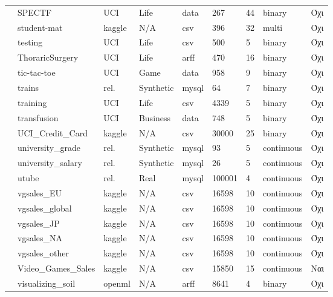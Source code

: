 {\begin{longtable}{|l| l| l | l | l | l |l | l | l | }
 				\rownumber & SPECTF \citep{spectf} & UCI & Life & data & 267 & 44 & binary & Όχι \\
 				\rownumber & student-mat \citep{alcohol} & kaggle & N/A & csv & 396 & 32 & multi & Όχι \\
 				\rownumber & testing \citep{wilt} & UCI & Life & csv & 500 & 5 & binary & Όχι \\
 				\rownumber & ThoraricSurgery  \citep{thoraric}& UCI & Life & arff & 470 & 16 & binary & Όχι  \\
 				\rownumber & tic-tac-toe \citep{tic} & UCI & Game & data & 958 & 9 &  binary & Όχι \\
 				\rownumber & trains \citep{Trains} & rel. & Synthetic & mysql & 64 & 7 & binary & Όχι \\
 				\rownumber & training \citep{wilt} & UCI & Life  & csv & 4339 & 5 & binary & Όχι \\
 				\rownumber & transfusion & UCI & Business & data & 748 & 5 & binary& Όχι \\
 				\rownumber & UCI\_Credit\_Card & kaggle & N/A & csv & 30000 & 25 & binary & Όχι \\
 				\rownumber & university\_grade \citep{uni} & rel. & Synthetic & mysql & 93 & 5  & continuous & Όχι \\
 				\rownumber & university\_salary \citep{uni} & rel. & Synthetic & mysql & 26 & 5 & continuous & Όχι \\
 				\rownumber & utube \citep{utube} & rel. & Real & mysql & 100001 & 4 & continuous & Όχι \\
 					\rownumber & vgsales\_EU \citep{vgsales} & kaggle & N/A & csv  & 16598 & 10 & continuous & Όχι\\
 					\rownumber & vgsales\_global \citep{vgsales} & kaggle & N/A & csv  & 16598 & 10 & continuous & Όχι \\
 					\rownumber & vgsales\_JP \citep{vgsales} & kaggle & N/A & csv  & 16598 & 10 & continuous & Όχι \\
 					\rownumber & vgsales\_NA \citep{vgsales} & kaggle & N/A & csv  & 16598 & 10 & continuous & Όχι \\
 					\rownumber & vgsales\_other \citep{vgsales} & kaggle & N/A & csv  & 16598 & 10 & continuous & Όχι \\
 					\rownumber & Video\_Games\_Sales \citep{vgames} & kaggle & N/A & csv & 15850 & 15 & continuous & Ναι \\
 					\rownumber & visualizing\_soil \citep{soil} & openml & N/A & arff & 8641 & 4 & binary & Όχι \\

\end{longtable}}
